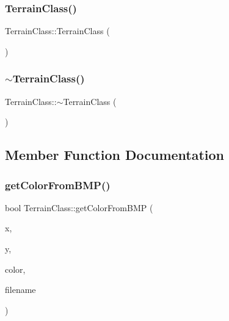\subsubsection{\texorpdfstring{Terrain\+Class()}{TerrainClass()}\hspace{0.1cm}{\footnotesize\ttfamily [2/2]}}
{\footnotesize\ttfamily Terrain\+Class\+::\+Terrain\+Class (\begin{DoxyParamCaption}\item[{const \hyperlink{class_terrain_class}{Terrain\+Class} \&}]{ }\end{DoxyParamCaption})}

\mbox{\label{class_terrain_class_a6b287f4d422d8f6b9e3206ef1ea2ee27}} 
\subsubsection{\texorpdfstring{$\sim$\+Terrain\+Class()}{~TerrainClass()}}
{\footnotesize\ttfamily Terrain\+Class\+::$\sim$\+Terrain\+Class (\begin{DoxyParamCaption}{ }\end{DoxyParamCaption})}



\subsection{Member Function Documentation}
\mbox{\label{class_terrain_class_a87c388bacd31188df5c9a0cbde20975a}} 
\subsubsection{\texorpdfstring{get\+Color\+From\+B\+M\+P()}{getColorFromBMP()}}
{\footnotesize\ttfamily bool Terrain\+Class\+::get\+Color\+From\+B\+MP (\begin{DoxyParamCaption}\item[{float}]{x,  }\item[{float}]{y,  }\item[{D3\+D\+X\+V\+E\+C\+T\+O\+R3 \&}]{color,  }\item[{\hyperlink{class_path_class}{Path\+Class} $\ast$}]{filename }\end{DoxyParamCaption})}

